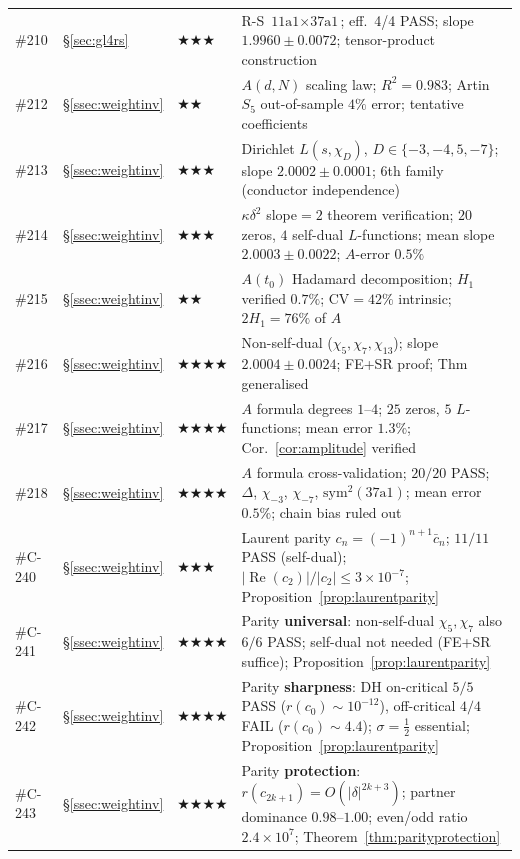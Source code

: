 \documentclass[11pt, a4paper]{article}
\theoremstyle{plain}
\theoremstyle{definition}
\begin{document}
\begin{longtable}{lllp{5.5cm}}
\#210 & \S\ref{sec:gl4rs}         & \textbf{$\bigstar\bigstar\bigstar$}    & R-S $\text{11a1}\times\text{37a1}$; eff.\ 4/4 PASS; slope $\mathbf{1.9960\pm0.0072}$; tensor-product construction \\
\#212 & \S\ref{ssec:weightinv}    & \textbf{$\bigstar\bigstar$}           & $A(d,N)$ scaling law; $R^{2}=0.983$; Artin $S_5$ out-of-sample $4\%$ error; tentative coefficients \\
\#213 & \S\ref{ssec:weightinv}    & \textbf{$\bigstar\bigstar\bigstar$}    & Dirichlet $L(s,\chi_D)$, $D\in\{-3,-4,5,-7\}$; slope $\mathbf{2.0002\pm0.0001}$; 6th family (conductor independence) \\
\#214 & \S\ref{ssec:weightinv}    & \textbf{$\bigstar\bigstar\bigstar$}    & $\kappa\delta^{2}$ slope${}=2$ theorem verification; $20$ zeros, $4$ self-dual $L$-functions; mean slope $2.0003\pm0.0022$; $A$-error $0.5\%$ \\
\#215 & \S\ref{ssec:weightinv}    & \textbf{$\bigstar\bigstar$}           & $A(t_0)$ Hadamard decomposition; $H_1$ verified $0.7\%$; CV$=42\%$ intrinsic; $2H_1=76\%$ of $A$ \\
\#216 & \S\ref{ssec:weightinv}    & \textbf{$\bigstar\bigstar\bigstar\bigstar$} & Non-self-dual ($\chi_5,\chi_7,\chi_{13}$); slope $\mathbf{2.0004\pm0.0024}$; FE+SR proof; Thm generalised \\
\#217 & \S\ref{ssec:weightinv}    & \textbf{$\bigstar\bigstar\bigstar\bigstar$} & $A$ formula degrees $1$--$4$; $25$ zeros, $5$ $L$-functions; mean error $1.3\%$; Cor.~\ref{cor:amplitude} verified \\
\#218 & \S\ref{ssec:weightinv}    & \textbf{$\bigstar\bigstar\bigstar\bigstar$} & $A$ formula cross-validation; $20/20$ PASS; $\Delta$, $\chi_{-3}$, $\chi_{-7}$, $\mathrm{sym}^{2}(\text{37a1})$; mean error $0.5\%$; chain bias ruled out \\
\#C-240 & \S\ref{ssec:weightinv} & \textbf{$\bigstar\bigstar\bigstar$} & Laurent parity $c_n=(-1)^{n{+}1}\bar{c}_n$; $11/11$ PASS (self-dual); $|\!\operatorname{Re}(c_2)|/|c_2|\leq 3{\times}10^{-7}$; Proposition~\ref{prop:laurentparity} \\
\#C-241 & \S\ref{ssec:weightinv} & \textbf{$\bigstar\bigstar\bigstar\bigstar$} & Parity \textbf{universal}: non-self-dual $\chi_5,\chi_7$ also $6/6$ PASS; self-dual not needed (FE+SR suffice); Proposition~\ref{prop:laurentparity} \\
\#C-242 & \S\ref{ssec:weightinv} & \textbf{$\bigstar\bigstar\bigstar\bigstar$} & Parity \textbf{sharpness}: DH on-critical $5/5$ PASS ($r(c_0){\sim}10^{-12}$), off-critical $4/4$ FAIL ($r(c_0){\sim}4.4$); $\sigma{=}\tfrac{1}{2}$ essential; Proposition~\ref{prop:laurentparity} \\
\#C-243 & \S\ref{ssec:weightinv} & \textbf{$\bigstar\bigstar\bigstar\bigstar$} & Parity \textbf{protection}: $r(c_{2k{+}1}){=}O(|\delta|^{2k{+}3})$; partner dominance $0.98$--$1.00$; even/odd ratio $2.4{\times}10^{7}$; Theorem~\ref{thm:parityprotection} \\
\end{longtable}
\end{document}
